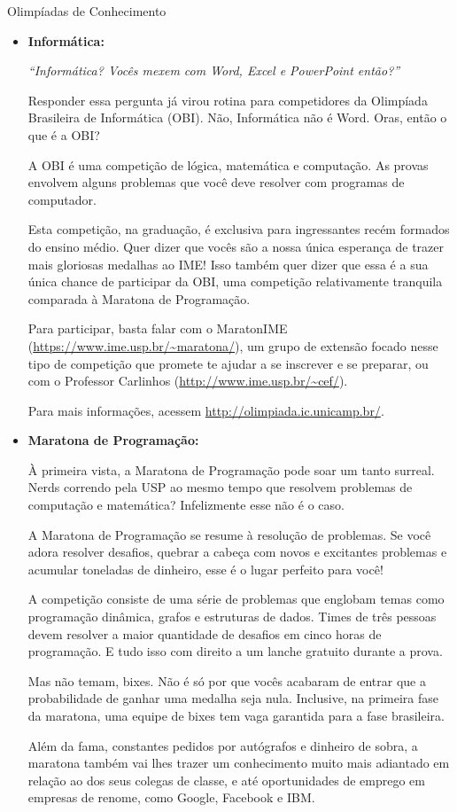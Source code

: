 \begin{subsecao}{Olimpíadas de Conhecimento}
\begin{itemize}
\item{\bf Informática: }

\textit{``Informática? Vocês mexem com Word, Excel e PowerPoint então?''}

Responder essa pergunta já virou rotina para competidores da Olimpíada
Brasileira de Informática (OBI). Não, Informática não é Word. Oras, então o que é a OBI?

A OBI é uma competição de lógica, matemática e computação. As provas envolvem
alguns problemas que você deve resolver com programas de computador.

Esta competição, na graduação, é exclusiva para ingressantes recém formados do
ensino médio. Quer dizer que vocês são a nossa única esperança de trazer mais
gloriosas medalhas ao IME! Isso também quer dizer que essa é a sua única chance
de participar da OBI, uma competição relativamente tranquila comparada à
Maratona de Programação.

Para participar, basta falar com o MaratonIME
(\url{https://www.ime.usp.br/~maratona/}), um grupo de extensão focado nesse
tipo de competição que promete te ajudar a se inscrever e se preparar, ou com o
Professor Carlinhos (\url{http://www.ime.usp.br/~cef/}).

Para mais informações, acessem \url{http://olimpiada.ic.unicamp.br/}.

\item{\bf Maratona de Programação: }

À primeira vista, a Maratona de Programação pode soar um tanto
surreal. Nerds correndo pela USP ao mesmo tempo que resolvem
problemas de computação e matemática? Infelizmente esse não
é o caso.

A Maratona de Programação se resume à resolução de problemas.
Se você adora resolver desafios, quebrar a cabeça com novos
e excitantes problemas e acumular toneladas de dinheiro, esse
é o lugar perfeito para você!

A competição consiste de uma série de problemas que englobam
temas como programação dinâmica, grafos e estruturas de dados.
Times de três pessoas devem resolver a maior quantidade de
desafios em cinco horas de programação. E tudo isso com direito
a um lanche gratuito durante a prova.

Mas não temam, bixes. Não é só por que vocês acabaram de entrar que
a probabilidade de ganhar uma medalha seja nula. Inclusive, na primeira
fase da maratona, uma equipe de bixes tem vaga garantida para a
fase brasileira.

Além da fama, constantes pedidos por autógrafos e dinheiro de sobra,
a maratona também vai lhes trazer um conhecimento muito mais
adiantado em relação ao dos seus colegas de classe, e até oportunidades
de emprego em empresas de renome, como Google, Facebook e IBM.


\end{itemize}
\end{subsecao}
